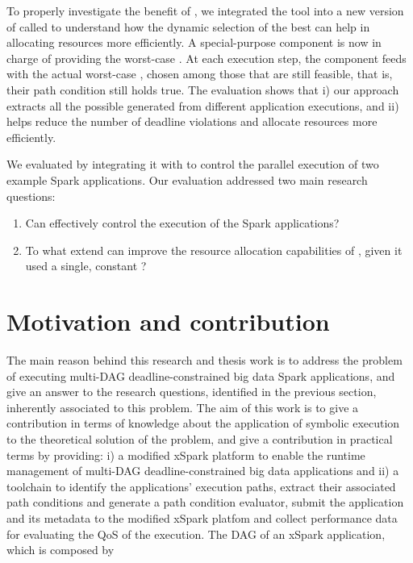 To properly investigate the benefit of \dSymb, we integrated the tool into a new version of  \cSpark called \tool to understand how the dynamic selection of the best \plan can help in allocating resources more efficiently. A special-purpose component is now in charge of providing the worst-case \plan. At each execution step, the component feeds \cSpark with the actual worst-case \plan, chosen among those that are still feasible, that is, their path condition still holds true. The evaluation shows that i) our approach extracts all the possible \plans generated from different application executions, and  ii) \dSymb helps \cSpark reduce the number of deadline violations and allocate resources more efficiently.

We evaluated  \dSymb by integrating it with \cSpark to control the parallel execution of two example Spark applications. Our evaluation addressed two main research questions:

\begin{enumerate}%
	\item Can \dSymb effectively control the execution of the Spark applications?
	\item To what extend can \dSymb improve the resource allocation capabilities of
	\cSpark, given it used a single, constant \plan?
\end{enumerate}

\section*{Motivation and contribution}
The main reason behind this research and thesis work is to address the problem of executing multi-DAG deadline-constrained big data Spark applications, and give an answer to the research questions, identified in the previous section, inherently associated to this problem. The aim of this work is to give a contribution in terms of knowledge about the application of symbolic execution to the theoretical solution of the problem, and give a contribution in practical terms by providing: i) a modified xSpark platform to enable the runtime management of multi-DAG deadline-constrained big data applications and ii) a toolchain to identify the applications' execution paths,  extract their associated path conditions and generate a path condition evaluator, submit the application and its metadata to the modified xSpark platfom and collect performance data for evaluating the QoS of the execution. The DAG of an xSpark application, which is composed by 

